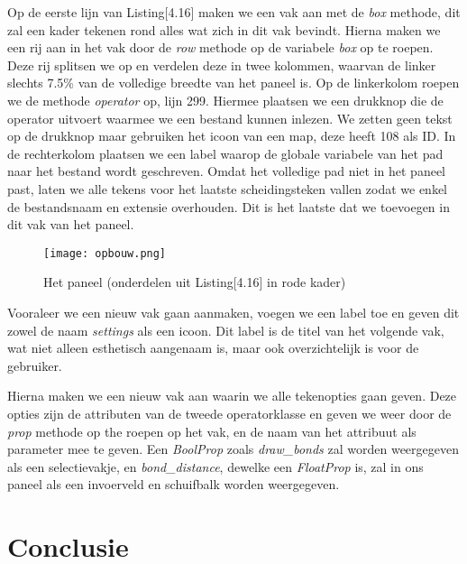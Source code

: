 Op de eerste lijn van Listing[4.16] maken we een vak aan met de \textit{box} methode, dit zal een kader tekenen rond alles wat zich in dit vak bevindt. Hierna maken we een rij aan in het vak door de \textit{row} methode op de variabele \textit{box} op te roepen. Deze rij splitsen we op en verdelen deze in twee kolommen, waarvan de linker slechts 7.5\% van de volledige breedte van het paneel is. Op de linkerkolom roepen we de methode \textit{operator} op, lijn 299. Hiermee plaatsen we een drukknop die de operator uitvoert waarmee we een bestand kunnen inlezen. We zetten geen tekst op de drukknop maar gebruiken het icoon van een map, deze heeft 108 als ID. In de rechterkolom plaatsen we een label waarop de globale variabele van het pad naar het bestand wordt geschreven. Omdat het volledige pad niet in het paneel past, laten we alle tekens voor het laatste scheidingsteken vallen zodat we enkel de bestandsnaam en extensie overhouden. Dit is het laatste dat we toevoegen in dit vak van het paneel.
\par
\begin{figure}[H]
\begin{center}
\texttt{[image: opbouw.png]}
\caption{Het paneel (onderdelen uit Listing[4.16] in rode kader)}
\end{center}
\end{figure}

Vooraleer we een nieuw vak gaan aanmaken, voegen we een label toe en geven dit zowel de naam \textit{settings} als een icoon. Dit label is de titel van het volgende vak, wat niet alleen esthetisch aangenaam is, maar ook overzichtelijk is voor de gebruiker.
\par 
Hierna maken we een nieuw vak aan waarin we alle tekenopties gaan geven. Deze opties zijn de attributen van de tweede operatorklasse en geven we weer door de \textit{prop} methode op the roepen op het vak, en de naam van het attribuut als parameter mee te geven. Een \textit{BoolProp} zoals \textit{draw\_bonds} zal worden weergegeven als een selectievakje, en \textit{bond\_distance}, dewelke een \textit{FloatProp} is, zal in ons paneel als een invoerveld en schuifbalk worden weergegeven.
     
  
\section{Conclusie}

